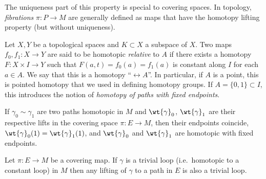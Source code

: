 The uniqueness part of this property is special to covering spaces. In topology, \emph{fibrations} $\pi: P\to M$  are generally defined as maps that have the homotopy lifting property (but without uniqueness).

\begin{defn}
    Let $X,Y$ be a topological spaces and $K\subset X$ a subspace of $X$. Two maps $f_0,f_1:X\to Y$ are said to be homotopic \emph{relative} to $A$ if there exists a homotopy $F:X\times I\to Y$ such that $F(a,t)=f_0(a)=f_1(a)$ is constant along $I$ for each $a\in A$. We say that this is a homotopy ``$\rel A$''. In particular, if $A$ is a point, this is pointed homotopy that we used in defining homotopy groups. If $A=\{0,1\}\subset I$, this introduces the notion of \emph{homotopy of paths with fixed endpoints}.
\end{defn}
\begin{cor}\label{cor 3.5 Bredon}
    If $\gamma_0\sim \gamma_1$ are two paths homotopic in $M$ and $\wt{\gamma}_0$, $\wt{\gamma}_1$ are their respective lifts in the covering space $\pi:E\to M$, then their endpoints coincide, $\wt{\gamma}_0(1)=\wt{\gamma}_1(1)$, and $\wt{\gamma}_0$ and $\wt{\gamma}_1$ are homotopic with fixed endpoints.
\end{cor}
\begin{cor}
    Let $\pi:E\to M$ be a covering map. If $\gamma$ is a trivial loop (i.e.\ homotopic to a constant loop) in $M$ then any lifting of $\gamma$ to a path in $E$ is also a trivial loop.
\end{cor}

